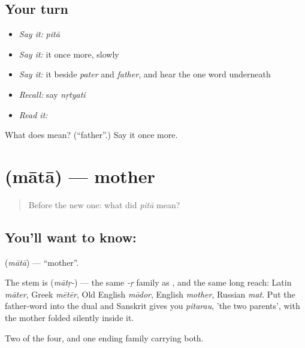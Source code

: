 \subsection*{Your turn}
\begin{itemize}
\raggedright
  \item \emph{Say it:} \emph{pitā}
  \item \emph{Say it:} it once more, slowly
  \item \emph{Say it:} it beside \emph{pater} and \emph{father}, and hear the one word underneath
  \item \emph{Recall:} say \emph{nṛtyati}
  \item \emph{Read it:} \textbf{}
\end{itemize}

\begin{tcolorbox}[breakable,colback=teal!4,colframe=teal!35!black,title={Before you move on}]
What does  mean? (\textquotedblleft{}father\textquotedblright{}.) Say it once more.
\end{tcolorbox}
\section[\texorpdfstring{\sk{माता} (mātā)}{माता (mātā)}]{ (mātā) — mother}

\label{lesson:SA-C23-mother}



\begin{quote}
Before the new one: what did \emph{pitā} mean?
\end{quote}

\subsection*{You'll want to know: }
\textbf{} (\emph{mātā}) — \textquotedblleft{}mother\textquotedblright{}.

The stem is \textbf{} (\emph{mātṛ-}) — the same \emph{-ṛ} family as , and the same long reach: Latin \emph{māter}, Greek \emph{mētēr}, Old English \emph{mōdor}, English \emph{mother}, Russian \emph{mat}. Put the father-word into the dual and Sanskrit gives you \emph{pitarau}, 'the two parents', with the mother folded silently inside it.

\begin{grammarlens}[title={What you've built}]
Two of the four, and one ending family carrying both.
\end{grammarlens}

